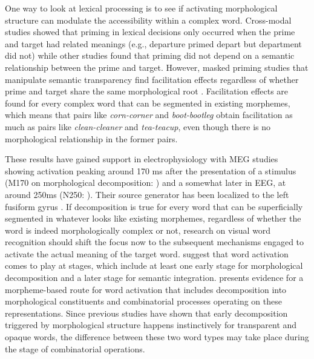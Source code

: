 \documentclass{frontiersSCNS}
\begin{document}
	One way to look at lexical processing is to see if activating morphological structure can modulate the accessibility within a complex word. Cross-modal studies \citep{Marslen-Wilson:1994} showed that priming in lexical decisions only occurred when the prime and target had related meanings (e.g., departure primed depart but department did not) while other studies \citep*{Zwitserlood:1994} found that priming did not depend on a semantic relationship between the prime and target. However, masked priming studies that manipulate semantic transparency find facilitation effects regardless of whether prime and target share the same morphological root \citep*{Rastle:2004, Longtin:2003, Fiorentino:2007, McCormick:2008}.  Facilitation effects are found for every complex word that can be segmented in existing morphemes, which means that pairs like \textit{corn-corner} and \textit{boot-bootleg} obtain facilitation as much as pairs like \textit{clean-cleaner} and \textit{tea-teacup}, even though there is no morphological relationship in the former pairs.

	These results have gained support in electrophysiology with MEG studies showing activation peaking around 170 ms after the presentation of a stimulus (M170 on morphological decomposition: \citealt{Solomyak:2010}) and a somewhat later in EEG, at around 250ms (N250: \citealt{Morris:2007}). Their source generator has been localized to the left fusiform gyrus \citep*{Dehaene:2010, Solomyak:2010}.
If decomposition is true for every word that can be superficially segmented in whatever looks like existing morphemes, regardless of whether the word is indeed morphologically complex or not, research on visual word recognition should shift the focus now to the subsequent mechanisms engaged to activate the actual meaning of the target word.  \citet*{Meunier:2007} suggest that word activation comes to play at stages, which include at least one early stage for morphological decomposition and a later stage for semantic integration. \citet*{Fiorentino:2013} presents evidence for a morpheme-based route for word activation that includes decomposition into morphological constituents and combinatorial processes operating on these representations.  Since previous studies have shown that early decomposition triggered by morphological structure happens instinctively for transparent and opaque words, the difference between these two word types may take place during the stage of combinatorial operations.
\end{document}
